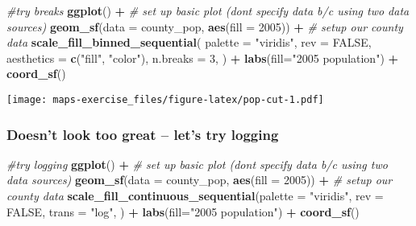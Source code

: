 \documentclass[
]{article}
\newenvironment{Shaded}{\begin{snugshade}}{\end{snugshade}}
\newcommand{\AttributeTok}[1]{\textcolor[rgb]{0.13,0.29,0.53}{#1}}
\newcommand{\CommentTok}[1]{\textcolor[rgb]{0.56,0.35,0.01}{\textit{#1}}}
\newcommand{\ConstantTok}[1]{\textcolor[rgb]{0.56,0.35,0.01}{#1}}
\newcommand{\DecValTok}[1]{\textcolor[rgb]{0.00,0.00,0.81}{#1}}
\newcommand{\FunctionTok}[1]{\textcolor[rgb]{0.13,0.29,0.53}{\textbf{#1}}}
\newcommand{\NormalTok}[1]{#1}
\newcommand{\SpecialCharTok}[1]{\textcolor[rgb]{0.81,0.36,0.00}{\textbf{#1}}}
\newcommand{\StringTok}[1]{\textcolor[rgb]{0.31,0.60,0.02}{#1}}
\begin{document}
\begin{Shaded}
\begin{Highlighting}[]
\CommentTok{\#try breaks}
\FunctionTok{ggplot}\NormalTok{() }\SpecialCharTok{+} \CommentTok{\# set up basic plot (don\textquotesingle{}t specify data b/c using two data sources)}
 \FunctionTok{geom\_sf}\NormalTok{(}\AttributeTok{data =}\NormalTok{ county\_pop, }\FunctionTok{aes}\NormalTok{(}\AttributeTok{fill =} \StringTok{\textasciigrave{}}\AttributeTok{2005}\StringTok{\textasciigrave{}}\NormalTok{)) }\SpecialCharTok{+} \CommentTok{\# setup our county data}
 \FunctionTok{scale\_fill\_binned\_sequential}\NormalTok{(}
    \AttributeTok{palette =} \StringTok{"viridis"}\NormalTok{,}
    \AttributeTok{rev =} \ConstantTok{FALSE}\NormalTok{,}
    \AttributeTok{aesthetics =} \FunctionTok{c}\NormalTok{(}\StringTok{"fill"}\NormalTok{, }\StringTok{"color"}\NormalTok{),}
    \AttributeTok{n.breaks =} \DecValTok{3}\NormalTok{, }
\NormalTok{  ) }\SpecialCharTok{+}
  \FunctionTok{labs}\NormalTok{(}\AttributeTok{fill=}\StringTok{"2005 population"}\NormalTok{) }\SpecialCharTok{+} 
  \FunctionTok{coord\_sf}\NormalTok{() }
\end{Highlighting}
\end{Shaded}

\texttt{[image: maps-exercise\_files/figure-latex/pop-cut-1.pdf]}

\hypertarget{doesnt-look-too-great-lets-try-logging}{%
\subsubsection{Doesn't look too great -- let's try
logging}\label{doesnt-look-too-great-lets-try-logging}}

\begin{Shaded}
\begin{Highlighting}[]
\CommentTok{\#try logging}
\FunctionTok{ggplot}\NormalTok{() }\SpecialCharTok{+} \CommentTok{\# set up basic plot (don\textquotesingle{}t specify data b/c using two data sources)}
 \FunctionTok{geom\_sf}\NormalTok{(}\AttributeTok{data =}\NormalTok{ county\_pop, }\FunctionTok{aes}\NormalTok{(}\AttributeTok{fill =} \StringTok{\textasciigrave{}}\AttributeTok{2005}\StringTok{\textasciigrave{}}\NormalTok{)) }\SpecialCharTok{+} \CommentTok{\# setup our county data}
 \FunctionTok{scale\_fill\_continuous\_sequential}\NormalTok{(}\AttributeTok{palette =} \StringTok{"viridis"}\NormalTok{, }\AttributeTok{rev =} \ConstantTok{FALSE}\NormalTok{, }\AttributeTok{trans =} \StringTok{"log"}\NormalTok{, ) }\SpecialCharTok{+}
  \FunctionTok{labs}\NormalTok{(}\AttributeTok{fill=}\StringTok{"2005 population"}\NormalTok{) }\SpecialCharTok{+} 
  \FunctionTok{coord\_sf}\NormalTok{() }
\end{Highlighting}
\end{Shaded}
\end{document}
